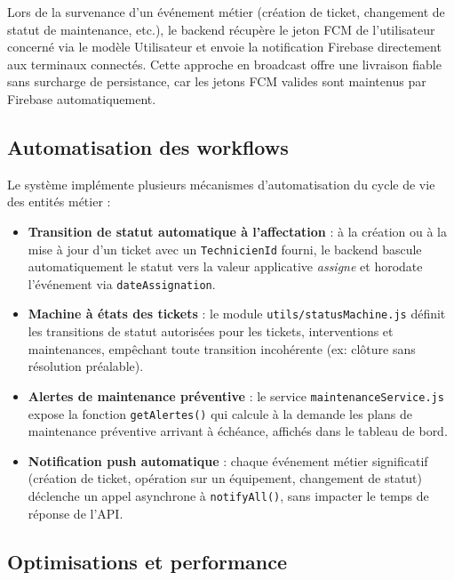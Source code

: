 Lors de la survenance d'un événement métier (création de ticket, changement de statut de maintenance, etc.), 
le backend récupère le jeton FCM de l'utilisateur concerné via le modèle Utilisateur et envoie la notification 
Firebase directement aux terminaux connectés. Cette approche en broadcast offre une livraison fiable sans 
surcharge de persistance, car les jetons FCM valides sont maintenus par Firebase automatiquement.


\subsection{Automatisation des workflows}
\label{subsec:automatisation_workflows}

Le système implémente plusieurs mécanismes d'automatisation du cycle de vie des entités métier :

\begin{itemize}
    \item \textbf{Transition de statut automatique à l'affectation} : à la création ou à la mise à jour
          d'un ticket avec un \texttt{TechnicienId} fourni, le backend bascule automatiquement
          le statut vers la valeur applicative \textit{assigne} et horodate l'événement via \texttt{dateAssignation}.
    \item \textbf{Machine à états des tickets} : le module \texttt{utils/statusMachine.js} définit
          les transitions de statut autorisées pour les tickets, interventions et maintenances,
          empêchant toute transition incohérente (ex: clôture sans résolution préalable).
    \item \textbf{Alertes de maintenance préventive} : le service \texttt{maintenanceService.js}
          expose la fonction \texttt{getAlertes()} qui calcule à la demande les plans de
          maintenance préventive arrivant à échéance, affichés dans le tableau de bord.
    \item \textbf{Notification push automatique} : chaque événement métier significatif
          (création de ticket, opération sur un équipement, changement de statut) déclenche
          un appel asynchrone à \texttt{notifyAll()}, sans impacter le temps de réponse de l'API.
\end{itemize}

\subsection{Optimisations et performance}
\label{subsec:optimisations_performance}

